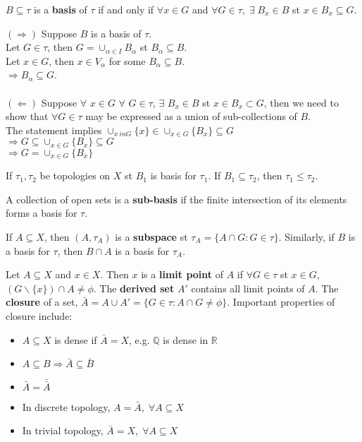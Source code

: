 \documentclass{article}
\begin{document}
$B \subseteq \tau$ is a \textbf{basis} of $\tau$ if and only if $\forall x \in G$ and $\forall G \in \tau, \; \exists \; B_x \in B$ st $x \in B_x \subseteq G$.
\begin{tcolorbox}[colback=lightgray!10,colframe=lightgray!10, fontupper=\linespread{1.5}\selectfont]
	$(\Rightarrow)$ Suppose $B$ is a basis of $\tau$. \\
	Let $G \in \tau$, then $G = \cup_{\alpha \in I}B_\alpha$ st $B_\alpha \subseteq B$. \\
	Let $x \in G$, then $x \in V_\alpha$ for some $B_\alpha \subseteq B$. \\
	$\Rightarrow B_\alpha \subseteq G$. \\\\
	$(\Leftarrow)$ Suppose $\forall$ $x \in G$ $\forall$ $G \in \tau$, $\exists$ $B_x \in B$ st $x \in B_x \subset G$, then we need to show that $\forall G \in \tau$ may be expressed as a union of sub-collections of $B$. \\
	The statement implies $\cup_{x\ in G} \{x\} \in \cup_{x \in G} \{B_x\} \subseteq G$ \\
	$\Rightarrow G  \subseteq \cup_{x \in G} \{B_x\} \subseteq G$ \\
	$\Rightarrow G = \cup_{x \in G} \{B_x\}$
\end{tcolorbox}
If $\tau_1, \tau_2$ be topologies on $X$ st $B_1$ is basis for $\tau_1$. If $B_1 \subseteq \tau_2$, then $\tau_1 \leq \tau_2$.  

A collection of open sets is a \textbf{sub-basis} if the finite intersection of its elements forms a basis for $\tau$.

If $A \subseteq X$, then $(A, \tau_A)$ is a \textbf{subspace} st $\tau_A = \{A \cap G: G \in \tau\}$. Similarly, if $B$ is a basis for $\tau$, then $B \cap A$ is a basis for $\tau_A$.

Let $A \subseteq X$ and $x \in X$. Then $x$ is a \textbf{limit point} of $A$ if $\forall G \in \tau$ st $x \in G$, $(G\backslash\{x\}) \cap A \not= \phi$. The \textbf{derived set} $A'$ contains all limit points of $A$. The \textbf{closure} of a set, $\bar{A} = A \cup A' = \{G \in \tau: A \cap G \not= \phi\}$. Important properties of closure include: 
\begin{itemize}
	\item $A\subseteq X$ is dense if $\bar{A} = X$, e.g. $\mathbb{Q}$ is dense in $\mathbb{R}$
	\item $A \subseteq B \Rightarrow \bar{A} \subseteq \bar{B}$
	\item $\bar{A} = \bar{\bar{A}}$
	\item In discrete topology, $A = \bar{A}, \; \forall A \subseteq X$
	\item In trivial topology, $\bar{A} = X, \; \forall A \subseteq X$
\end{itemize}
\end{document}

